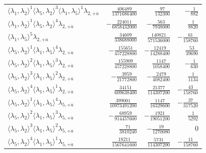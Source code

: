 \begin{longtable}{@{}lrrr@{}}
$\langle\lambda_1,\lambda_2\rangle^{1}\langle\lambda_5,\lambda_2\rangle^{3}\langle\lambda_1,\lambda_5\rangle^{1}\lambda_{2,+\dot a}$ & $\frac{406489}{1371686400}$ & $\frac{97}{132300}$ & $-\frac{1}{882}$ \\
$\langle\lambda_1,\lambda_2\rangle^{1}\langle\lambda_5,\lambda_2\rangle^{4}\lambda_{2,+\dot a}$ & $-\frac{224011}{6858432000}$ & $-\frac{563}{7938000}$ & $\frac{1}{8820}$ \\
$\langle\lambda_1,\lambda_5\rangle^{5}\lambda_{2,+\dot a}$ & $\frac{34609}{338688000}$ & $\frac{140821}{571536000}$ & $-\frac{61}{158760}$ \\
$\langle\lambda_5,\lambda_2\rangle^{1}\langle\lambda_1,\lambda_5\rangle^{4}\lambda_{2,+\dot a}$ & $-\frac{155651}{457228800}$ & $-\frac{12419}{14288400}$ & $\frac{53}{39690}$ \\
$\langle\lambda_5,\lambda_2\rangle^{2}\langle\lambda_1,\lambda_5\rangle^{3}\lambda_{2,+\dot a}$ & $\frac{155909}{457228800}$ & $\frac{1147}{1058400}$ & $-\frac{1}{630}$ \\
$\langle\lambda_5,\lambda_2\rangle^{3}\langle\lambda_1,\lambda_5\rangle^{2}\lambda_{2,+\dot a}$ & $-\frac{3959}{21772800}$ & $-\frac{2479}{4082400}$ & $\frac{1}{1134}$ \\
$\langle\lambda_5,\lambda_2\rangle^{4}\langle\lambda_1,\lambda_5\rangle^{1}\lambda_{2,+\dot a}$ & $\frac{34151}{609638400}$ & $\frac{21377}{114307200}$ & $-\frac{43}{158760}$ \\
$\langle\lambda_5,\lambda_2\rangle^{1}\langle\lambda_1,\lambda_5\rangle^{4}\lambda_{5,+\dot a}$ & $\frac{399001}{10973491200}$ & $\frac{1147}{16329600}$ & $-\frac{37}{317520}$ \\
$\langle\lambda_5,\lambda_2\rangle^{2}\langle\lambda_1,\lambda_5\rangle^{3}\lambda_{5,+\dot a}$ & $-\frac{68959}{914457600}$ & $-\frac{1921}{19051200}$ & $\frac{1}{5292}$ \\
$\langle\lambda_5,\lambda_2\rangle^{3}\langle\lambda_1,\lambda_5\rangle^{2}\lambda_{5,+\dot a}$ & $\frac{71}{3810240}$ & $-\frac{19}{1270080}$ & $0$ \\
$\langle\lambda_5,\lambda_2\rangle^{4}\langle\lambda_1,\lambda_5\rangle^{1}\lambda_{5,+\dot a}$ & $\frac{18211}{1567641600}$ & $\frac{5731}{114307200}$ & $-\frac{11}{158760}$ \\
\end{longtable}
